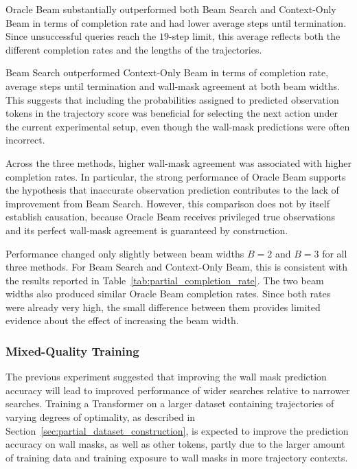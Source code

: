 ﻿\documentclass[12pt,a4paper]{article}
\theoremstyle{definition}
\begin{document}
Oracle Beam substantially outperformed both Beam Search and Context-Only Beam in terms of completion
rate and had lower average steps until termination. Since unsuccessful queries reach the $19$-step
limit, this average reflects both the different completion rates and the lengths of the trajectories.


Beam Search outperformed Context-Only Beam in terms of completion rate, average steps until termination and
wall-mask agreement at both beam widths. This suggests that including the probabilities assigned to
predicted observation tokens in the trajectory score was beneficial for selecting the next action under
the current experimental setup, even though the wall-mask predictions were often incorrect.

Across the three methods, higher wall-mask agreement was associated with higher completion rates. In
particular, the strong performance of Oracle Beam supports the hypothesis that inaccurate observation
prediction contributes to the lack of improvement from Beam Search. However, this comparison does not
by itself establish causation, because Oracle Beam receives privileged true observations and its perfect
wall-mask agreement is guaranteed by construction.

Performance changed only slightly between beam widths $B=2$ and $B=3$ for all three methods. For Beam
Search and Context-Only Beam, this is consistent with the results reported in
Table~\ref{tab:partial_completion_rate}. The two beam widths also produced similar Oracle Beam completion
rates. Since both rates were already very high, the small difference between them provides limited
evidence about the effect of increasing the beam width.

\subsubsection{Mixed-Quality Training}

The previous experiment suggested that improving the wall mask prediction accuracy will lead
to improved performance of wider searches relative to narrower searches. Training a Transformer
on a larger dataset containing trajectories of varying degrees of optimality, as described in
Section~\ref{sec:partial_dataset_construction}, is expected to improve the prediction accuracy
on wall masks, as well as other tokens, partly due to the larger amount of training data and training exposure
to wall masks in more trajectory contexts. 
\end{document}
